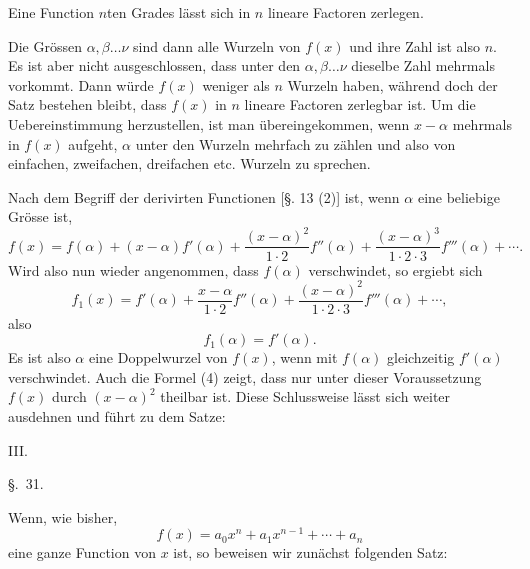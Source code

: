 
\noindent Eine Function $n$ten Grades lässt sich in $n$ lineare Factoren zerlegen.
\medskip

Die Grössen $\alpha,\beta\ldots\nu$ sind dann alle Wurzeln von $f(x)$ und ihre Zahl ist also $n$. Es ist aber nicht ausgeschlossen, dass unter den $\alpha,\beta\ldots\nu$ dieselbe Zahl mehrmals vorkommt. Dann würde $f(x)$ weniger als $n$ Wurzeln haben, während doch der Satz bestehen bleibt, dass $f(x)$ in $n$ lineare Factoren zerlegbar ist. Um die Uebereinstimmung herzustellen, ist man übereingekommen, wenn $x-\alpha$ mehrmals in $f(x)$ aufgeht, $\alpha$ unter den Wurzeln mehrfach zu zählen und also von einfachen, zweifachen, dreifachen etc. Wurzeln zu sprechen.

Nach dem Begriff der derivirten Functionen [§. 13 (2)] ist, wenn $\alpha$ eine beliebige Grösse ist,
\begin{equation}
 f(x)=f(\alpha)+(x-\alpha)f'(\alpha)+\frac{(x-\alpha)^2}{1\cdot2}f''(\alpha)
 +\frac{(x-\alpha)^3}{1\cdot2\cdot3}f'''(\alpha)+\cdots .
\tag{4}
\end{equation}
Wird also nun wieder angenommen, dass $f(\alpha)$ verschwindet, so ergiebt sich
\[
 f_1(x)=f'(\alpha)+\frac{x-\alpha}{1\cdot2}f''(\alpha)+\frac{(x-\alpha)^2}{1\cdot2\cdot3}f'''(\alpha)+\cdots,
\]
also
\[
 f_1(\alpha)=f'(\alpha).
\]
Es ist also $\alpha$ eine Doppelwurzel von $f(x)$, wenn mit $f(\alpha)$ gleichzeitig $f'(\alpha)$ verschwindet. Auch die Formel (4) zeigt, dass nur unter dieser Voraussetzung $f(x)$ durch $(x-\alpha)^2$ theilbar ist. Diese Schlussweise lässt sich weiter ausdehnen und führt zu dem Satze:

\medskip
\noindent III. 

\begin{center}
{\large \S.\ 31.}

\vspace{0.5em}
{\large{}}
\end{center}

Wenn, wie bisher,
\[
 f(x)=a_0x^n+a_1x^{n-1}+\cdots+a_n
\]
eine ganze Function von $x$ ist, so beweisen wir zunächst folgenden Satz:

\medskip
